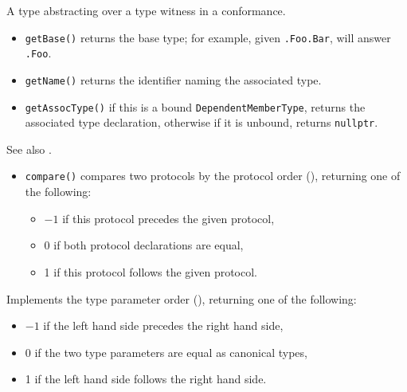 \documentclass[../generics]{subfiles}
\begin{document}
A type abstracting over a type witness in a conformance.
\begin{itemize}
\item \texttt{getBase()} returns the base type; for example, given \texttt{.Foo.Bar}, will answer \texttt{.Foo}.
\item \texttt{getName()} returns the identifier naming the associated type.
\item \texttt{getAssocType()} if this is a bound \texttt{DependentMemberType}, returns the associated type declaration, otherwise if it is unbound, returns \texttt{nullptr}.
\end{itemize}

See also .
\begin{itemize}
\item \texttt{compare()} compares two protocols by the protocol order (), returning one of the following:
\begin{itemize}
\item $-1$ if this protocol precedes the given protocol,
\item 0 if both protocol declarations are equal,
\item 1 if this protocol follows the given protocol.
\end{itemize}
\end{itemize}

Implements the type parameter order (), returning one of the following:
\begin{itemize}
\item $-1$ if the left hand side precedes the right hand side,
\item 0 if the two type parameters are equal as canonical types,
\item 1 if the left hand side follows the right hand side.
\end{itemize}
\end{document}
